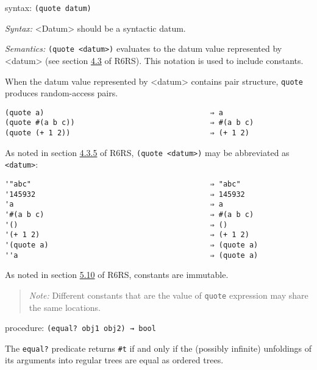 syntax: \texttt{(quote\ datum)}

\emph{Syntax:} \textless{}Datum\textgreater{} should be a syntactic
datum.

\emph{Semantics:} \texttt{(quote\ \textless{}datum\textgreater{})}
evaluates to the datum value represented by
\textless{}datum\textgreater{} (see section
\href{http://www.r6rs.org/final/html/r6rs/r6rs-Z-H-7.html\#node_sec_4.3}{4.3}
of R6RS). This notation is used to include constants.

When the datum value represented by \textless{}datum\textgreater{}
contains pair structure, \texttt{quote} produces random-access pairs.

\begin{verbatim}
(quote a)                                      ⇒ a
(quote #(a b c))                               ⇒ #(a b c)
(quote (+ 1 2))                                ⇒ (+ 1 2)
\end{verbatim}

As noted in section
\href{http://www.r6rs.org/final/html/r6rs/r6rs-Z-H-7.html\#node_sec_4.3.5}{4.3.5}
of R6RS, \texttt{(quote\ \textless{}datum\textgreater{})} may be
abbreviated as
\texttt{\textquotesingle{}\textless{}datum\textgreater{}}:

\begin{verbatim}
'"abc"                                         ⇒ "abc"
'145932                                        ⇒ 145932
'a                                             ⇒ a
'#(a b c)                                      ⇒ #(a b c)
'()                                            ⇒ ()
'(+ 1 2)                                       ⇒ (+ 1 2)
'(quote a)                                     ⇒ (quote a)
''a                                            ⇒ (quote a)
\end{verbatim}

As noted in section
\href{http://www.r6rs.org/final/html/r6rs/r6rs-Z-H-8.html\#node_sec_5.10}{5.10}
of R6RS, constants are immutable.

\begin{quote}
\emph{Note:} Different constants that are the value of \texttt{quote}
expression may share the same locations.
\end{quote}

procedure: \texttt{(equal?\ obj1\ obj2)\ →\ bool}

The \texttt{equal?} predicate returns \texttt{\#t} if and only if the
(possibly infinite) unfoldings of its arguments into regular trees are
equal as ordered trees.

